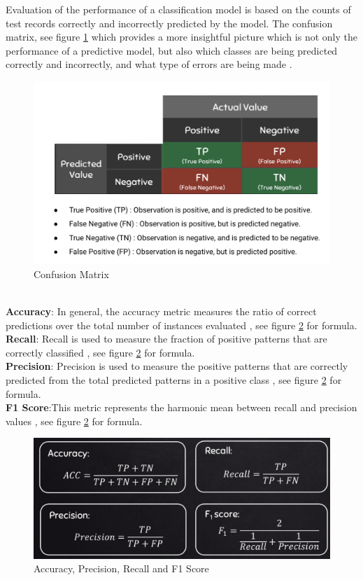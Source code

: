 \documentclass[format=sigconf]{acmart}
\begin{document}
Evaluation of the performance of a classification model is based on the counts of test records correctly and incorrectly predicted 
by the model. The confusion matrix, see figure \ref{fig:confusionmatrix} which provides a more insightful picture which is not only the 
performance of a predictive model, but also which classes are being predicted correctly and incorrectly, and what type of errors 
are being made \cite{confusionmatrix}.

\begin{figure}[H]
    \centering
    \includegraphics[scale=0.22]{confusion_matrix.png}
    \caption{Confusion Matrix}
    \label{fig:confusionmatrix}
\end{figure}
\hfill\\
\textbf{Accuracy}: In general, the accuracy metric measures the ratio of correct predictions over the total
number of instances evaluated \cite{hossin2015review}, see figure \ref{fig:aprf} for formula. \\
\textbf{Recall}: Recall is used to measure the fraction of positive patterns that are correctly classified \cite{hossin2015review}, 
see figure \ref{fig:aprf} for formula. \\
\textbf{Precision}: Precision is used to measure the positive patterns that are correctly predicted from the total predicted 
patterns in a positive class \cite{hossin2015review}, see figure \ref{fig:aprf} for formula. \\ 
\textbf{F1 Score}:This metric represents the harmonic mean between recall and precision values \cite{hossin2015review}, see figure 
\ref{fig:aprf} for formula. \\
\begin{figure}[H]
    \centering
    \includegraphics[scale=0.18]{evaluation_metrics_for_classification.png}
    \caption{Accuracy, Precision, Recall and F1 Score}
    \label{fig:aprf}
\end{figure}
\end{document}
